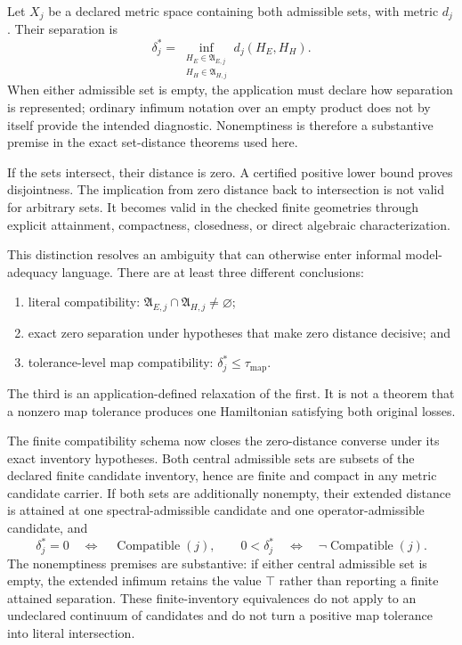 Let $X_j$ be a declared metric space containing both admissible sets, with metric
$d_j$.  Their separation is
\[
  \delta_j^*
  =\inf_{\substack{H_E\in\mathfrak A_{E,j}\\
                    H_H\in\mathfrak A_{H,j}}}
     d_j(H_E,H_H).
\]
When either admissible set is empty, the application must declare how separation is
represented; ordinary infimum notation over an empty product does not by itself provide
the intended diagnostic.  Nonemptiness is therefore a substantive premise in the exact
set-distance theorems used here.

If the sets intersect, their distance is zero.  A certified positive lower bound proves
disjointness.  The implication from zero distance back to intersection is not valid for
arbitrary sets.  It becomes valid in the checked finite geometries through explicit
attainment, compactness, closedness, or direct algebraic characterization.

This distinction resolves an ambiguity that can otherwise enter informal model-
adequacy language.  There are at least three different conclusions:

\begin{enumerate}
  \item literal compatibility: $\mathfrak A_{E,j}\cap\mathfrak A_{H,j}\neq\varnothing$;
  \item exact zero separation under hypotheses that make zero distance decisive; and
  \item tolerance-level map compatibility:
        $\delta_j^*\leq\tau_{\mathrm{map}}$.
\end{enumerate}

The third is an application-defined relaxation of the first.  It is not a theorem that
a nonzero map tolerance produces one Hamiltonian satisfying both original losses.

The finite compatibility schema now closes the zero-distance converse under its exact
inventory hypotheses.  Both central admissible sets are subsets of the declared finite
candidate inventory, hence are finite and compact in any metric candidate carrier.  If
both sets are additionally nonempty, their extended distance is attained at one
spectral-admissible candidate and one operator-admissible candidate, and
\[
  \delta_j^*=0
  \quad\Longleftrightarrow\quad
  \operatorname{Compatible}(j),
  \qquad
  0<\delta_j^*
  \quad\Longleftrightarrow\quad
  \neg\operatorname{Compatible}(j).
\]
The nonemptiness premises are substantive: if either central admissible set is empty,
the extended infimum retains the value $\top$ rather than reporting a finite attained
separation.  These finite-inventory equivalences do not apply to an undeclared continuum
of candidates and do not turn a positive map tolerance into literal intersection.


